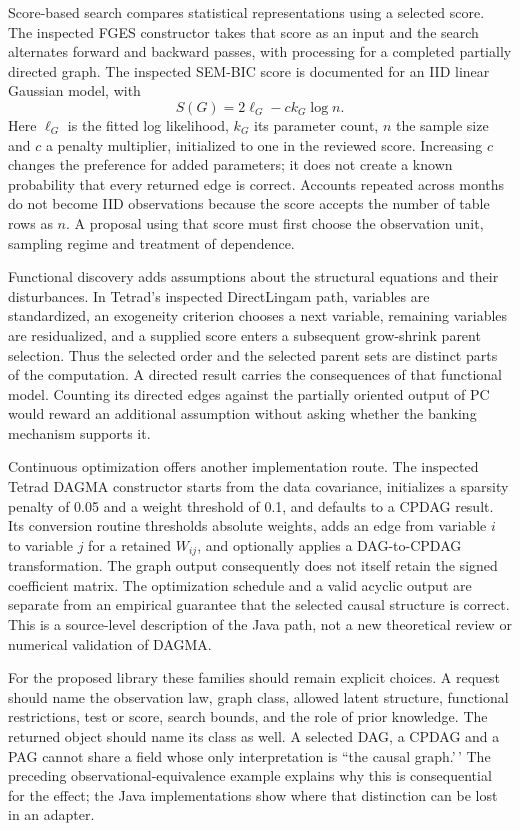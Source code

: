 Score-based search compares statistical representations using a selected
score. The inspected FGES constructor takes that score as an input and
the search alternates forward and backward passes, with processing for a
completed partially directed graph. The inspected SEM-BIC score is
documented for an IID linear Gaussian model, with \[
 S(G)=2\ell_G-c k_G\log n.
\] Here \(\ell_G\) is the fitted log likelihood, \(k_G\) its parameter
count, \(n\) the sample size and \(c\) a penalty multiplier, initialized
to one in the reviewed score. Increasing \(c\) changes the preference
for added parameters; it does not create a known probability that every
returned edge is correct. Accounts repeated across months do not become
IID observations because the score accepts the number of table rows as
\(n\). A proposal using that score must first choose the observation
unit, sampling regime and treatment of dependence.
\citep{exec13_java_tetrad}

Functional discovery adds assumptions about the structural equations and
their disturbances. In Tetrad's inspected DirectLingam path, variables
are standardized, an exogeneity criterion chooses a next variable,
remaining variables are residualized, and a supplied score enters a
subsequent grow-shrink parent selection. Thus the selected order and the
selected parent sets are distinct parts of the computation. A directed
result carries the consequences of that functional model. Counting its
directed edges against the partially oriented output of PC would reward
an additional assumption without asking whether the banking mechanism
supports it. \citep{exec13_java_tetrad}

Continuous optimization offers another implementation route. The
inspected Tetrad DAGMA constructor starts from the data covariance,
initializes a sparsity penalty of 0.05 and a weight threshold of 0.1,
and defaults to a CPDAG result. Its conversion routine thresholds
absolute weights, adds an edge from variable \(i\) to variable \(j\) for
a retained \(W_{ij}\), and optionally applies a DAG-to-CPDAG
transformation. The graph output consequently does not itself retain the
signed coefficient matrix. The optimization schedule and a valid acyclic
output are separate from an empirical guarantee that the selected causal
structure is correct. This is a source-level description of the Java
path, not a new theoretical review or numerical validation of DAGMA.
\citep{exec13_java_tetrad}

For the proposed library these families should remain explicit choices.
A request should name the observation law, graph class, allowed latent
structure, functional restrictions, test or score, search bounds, and
the role of prior knowledge. The returned object should name its class
as well. A selected DAG, a CPDAG and a PAG cannot share a field whose
only interpretation is ``the causal graph.'\,' The preceding
observational-equivalence example explains why this is consequential for
the effect; the Java implementations show where that distinction can be
lost in an adapter.

